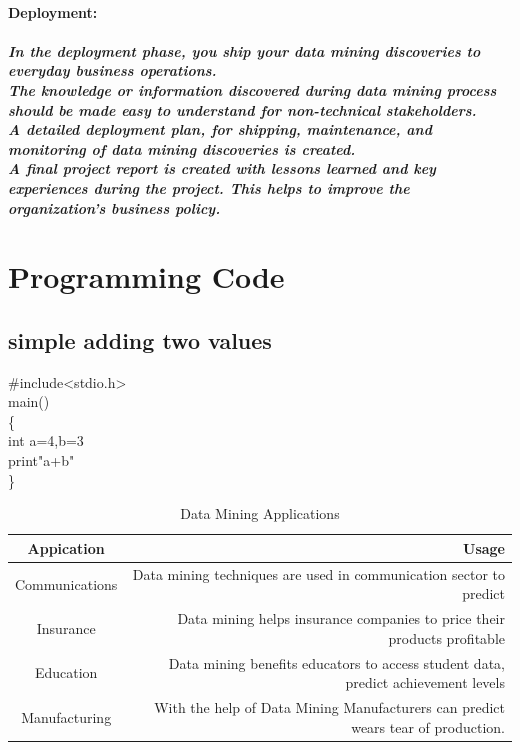 \documentclass{article}
\begin{document}
\paragraph{Deployment:}
\subparagraph{In the deployment phase, you ship your data mining discoveries to everyday business operations.\\The knowledge or information discovered during data mining process should be made easy to understand for non-technical stakeholders.\\A detailed deployment plan, for shipping, maintenance, and monitoring of data mining discoveries is created.\\A final project report is created with lessons learned and key experiences during the project. This helps to improve the organization's business policy.}
\section{Programming Code}
\subsection*{simple adding two values}
\#include<stdio.h>\\
main()\\
\{
\\int a=4,b=3\\
print"a+b"\\
\}
\begin{table}
\centering
\caption{Data Mining Applications}
\label{tab:tab 1}
\begin{tabular}{|c|r|}

 \hline Appication &Usage\\ \hline
Communications & Data mining techniques are used in communication sector to predict\\\hline
Insurance & Data mining helps insurance companies to price their products profitable \\\hline
Education & Data mining benefits educators to access student data, predict achievement levels\\\hline
Manufacturing &	With the help of Data Mining Manufacturers can predict wears tear of production.\\\hline
\end{tabular}
\end{table}
\end{document}
